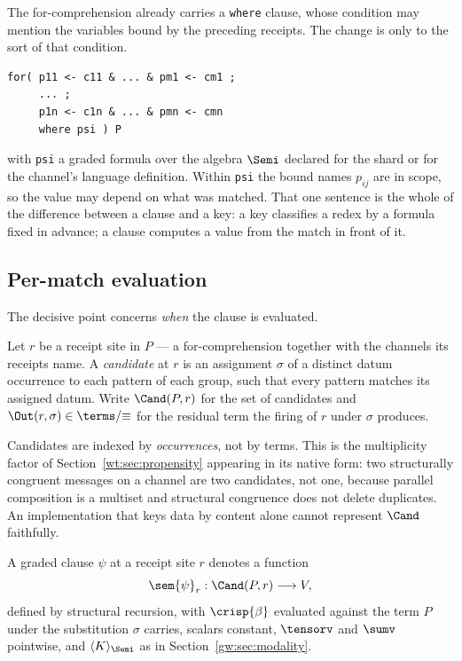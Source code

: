 The for-comprehension already carries a \texttt{where} clause, whose condition may
mention the variables bound by the preceding receipts. The change is only to the sort of
that condition.

\begin{lstlisting}
for( p11 <- c11 & ... & pm1 <- cm1 ;
     ... ;
     p1n <- c1n & ... & pmn <- cmn
     where psi ) P
\end{lstlisting}

\noindent
with \texttt{psi} a graded formula over the algebra $\Semi$ declared for the shard or
for the channel's language definition. Within \texttt{psi} the bound names $p_{ij}$ are
in scope, so the value may depend on what was matched. That one sentence is the whole of
the difference between a clause and a key: a key classifies a redex by a formula fixed in
advance; a clause computes a value from the match in front of it.

\subsection{Per-match evaluation}
\label{gw:sec:permatch}

The decisive point concerns \emph{when} the clause is evaluated.

\begin{definition}[Candidates]
\label{gw:def:cand}
Let $r$ be a receipt site in $P$ --- a for-comprehension together with the channels its
receipts name. A \emph{candidate} at $r$ is an assignment $\sigma$ of a distinct datum
occurrence to each pattern of each group, such that every pattern matches its assigned
datum. Write $\Cand(P,r)$ for the set of candidates and
$\Out(r,\sigma) \in \terms/{\equiv}$ for the residual term the firing of $r$ under
$\sigma$ produces.
\end{definition}

Candidates are indexed by \emph{occurrences}, not by terms. This is the multiplicity
factor of Section~\ref{wt:sec:propensity} appearing in its native form: two structurally
congruent messages on a channel are two candidates, not one, because parallel
composition is a multiset and structural congruence does not delete duplicates. An
implementation that keys data by content alone cannot represent $\Cand$ faithfully.

\begin{definition}
\label{gw:def:val}
A graded clause $\psi$ at a receipt site $r$ denotes a function
\[
  \sem{\psi}_r : \Cand(P,r) \longrightarrow V ,
\]
defined by structural recursion, with $\crisp{\beta}$ evaluated against the term $P$
under the substitution $\sigma$ carries, scalars constant, $\tensorv$ and $\sumv$
pointwise, and $\langle K \rangle_{\Semi}$ as in Section~\ref{gw:sec:modality}.
\end{definition}

